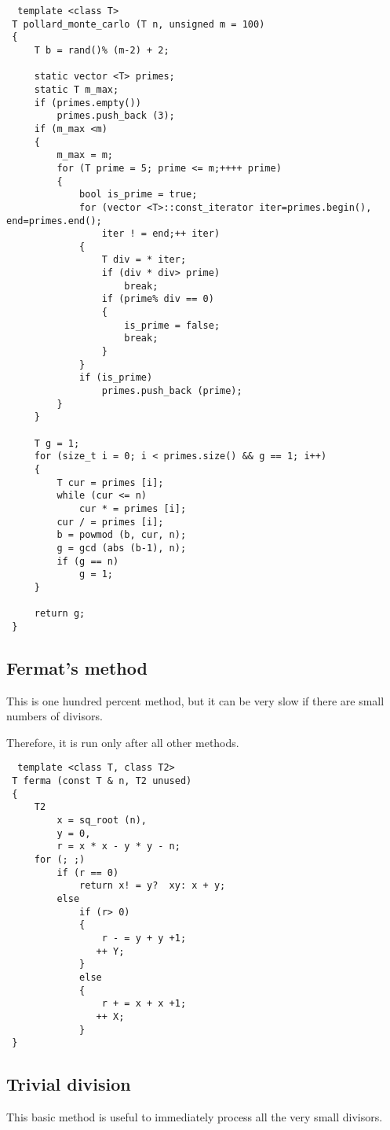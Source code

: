 \begin{verbatim}  template <class T>
 T pollard_monte_carlo (T n, unsigned m = 100)
 {
     T b = rand()% (m-2) + 2;

     static vector <T> primes;
     static T m_max;
     if (primes.empty())
         primes.push_back (3);
     if (m_max <m)
     {
         m_max = m;
         for (T prime = 5; prime <= m;++++ prime)
         {
             bool is_prime = true;
             for (vector <T>::const_iterator iter=primes.begin(), end=primes.end();
                 iter ! = end;++ iter)
             {
                 T div = * iter;
                 if (div * div> prime)
                     break;
                 if (prime% div == 0)
                 {
                     is_prime = false;
                     break;
                 }
             }
             if (is_prime)
                 primes.push_back (prime);
         }
     }

     T g = 1;
     for (size_t i = 0; i < primes.size() && g == 1; i++)
     {
         T cur = primes [i];
         while (cur <= n)
             cur * = primes [i];
         cur / = primes [i];
         b = powmod (b, cur, n);
         g = gcd (abs (b-1), n);
         if (g == n)
             g = 1;
     }

     return g;
 } 
\end{verbatim}\subsection{ Fermat's method }
This is one hundred percent method, but it can be very slow if there are small numbers of divisors.

Therefore, it is run only after all other methods.

\begin{verbatim}  template <class T, class T2>
 T ferma (const T & n, T2 unused)
 {
     T2
         x = sq_root (n),
         y = 0,
         r = x * x - y * y - n;
     for (; ;)
         if (r == 0)
             return x! = y?  xy: x + y;
         else
             if (r> 0)
             {
                 r - = y + y +1;
                ++ Y;
             }
             else
             {
                 r + = x + x +1;
                ++ X;
             }
 } 
\end{verbatim}\subsection{ Trivial division }
This basic method is useful to immediately process all the very small divisors.

